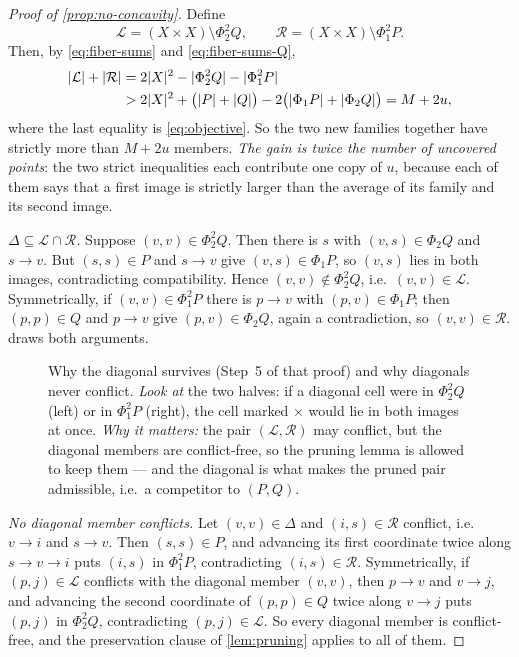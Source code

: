 \begin{proof}[Proof of \cref{prop:no-concavity}]
Define
\begin{equation}\label{eq:L-R}
 \mathcal L=(X\times X)\setminus\Phi_2^2Q,\qquad
 \mathcal R=(X\times X)\setminus\Phi_1^2P .
\end{equation}
Then, by \eqref{eq:fiber-sums} and \eqref{eq:fiber-sums-Q},
\begin{align}
 \lvert \mathcal L\rvert+\lvert \mathcal R\rvert
 &=2\lvert X\rvert^2-\lvert \Phi_2^2Q\rvert-\lvert \Phi_1^2P\rvert\notag\\
 &>2\lvert X\rvert^2+\bigl(\lvert P\rvert+\lvert Q\rvert\bigr)-2\bigl(\lvert \Phi_1P\rvert+\lvert \Phi_2Q\rvert\bigr)
 =M+2u ,
 \label{eq:gain}
\end{align}
where the last equality is \eqref{eq:objective}. So the two new families together have strictly more
than $M+2u$ members. \emph{The gain is twice the number of uncovered points}: the two strict
inequalities each contribute one copy of $u$, because each of them says that a first image is
strictly larger than the average of its family and its second image.

\emph{$\Delta\subseteq\mathcal L\cap\mathcal R$.} Suppose $(v,v)\in\Phi_2^2Q$. Then there is $s$ with
$(v,s)\in\Phi_2Q$ and $s\to v$. But $(s,s)\in P$ and $s\to v$ give $(v,s)\in\Phi_1P$, so $(v,s)$
lies in both images, contradicting compatibility. Hence $(v,v)\notin\Phi_2^2Q$, i.e.\
$(v,v)\in\mathcal L$. Symmetrically, if $(v,v)\in\Phi_1^2P$ there is $p\to v$ with
$(p,v)\in\Phi_1P$; then $(p,p)\in Q$ and $p\to v$ give $(p,v)\in\Phi_2Q$, again a contradiction, so
$(v,v)\in\mathcal R$. \Cref{fig:diagonal} draws both arguments.

\begin{figure}[t]
\centering

\caption{Why the diagonal survives (Step~5 of that proof) and why diagonals never conflict. \emph{Look
 at} the two halves: if a diagonal cell were in $\Phi_2^2Q$ (left) or in $\Phi_1^2P$ (right), the
 cell marked $\times$ would lie in both images at once. \emph{Why it matters:} the pair
 $(\mathcal L,\mathcal R)$ may conflict, but the diagonal members are conflict-free, so the pruning
 lemma is allowed to keep them --- and the diagonal is what makes the pruned pair admissible, i.e.\
 a competitor to $(P,Q)$.}
\label{fig:diagonal}
\end{figure}

\emph{No diagonal member conflicts.} Let $(v,v)\in\Delta$ and $(i,s)\in\mathcal R$ conflict, i.e.\
$v\to i$ and $s\to v$. Then $(s,s)\in P$, and advancing its first coordinate twice along
$s\to v\to i$ puts $(i,s)$ in $\Phi_1^2P$, contradicting $(i,s)\in\mathcal R$. Symmetrically, if
$(p,j)\in\mathcal L$ conflicts with the diagonal member $(v,v)$, then $p\to v$ and $v\to j$, and
advancing the second coordinate of $(p,p)\in Q$ twice along $v\to j$ puts $(p,j)$ in $\Phi_2^2Q$,
contradicting $(p,j)\in\mathcal L$. So every diagonal member is conflict-free, and the preservation
clause of \cref{lem:pruning} applies to all of them.


\end{proof}
